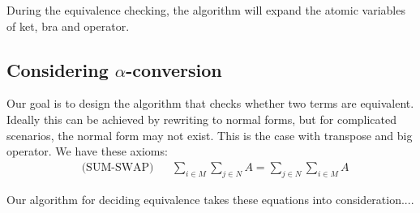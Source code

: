 During the equivalence checking, the algorithm will expand the atomic variables of ket, bra and operator.

\subsection{Considering $\alpha$-conversion}

Our goal is to design the algorithm that checks whether two terms are equivalent. Ideally this can be achieved by rewriting to normal forms, but for complicated scenarios, the normal form may not exist. This is the case with transpose and big operator. We have these axioms: 
\begin{align*}
& \text{(SUM-SWAP)} && \sum_{i \in M} \sum_{j \in N} A = \sum_{j \in N} \sum_{i \in M} A 
\end{align*}

Our algorithm for deciding equivalence takes these equations into consideration....